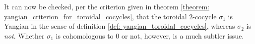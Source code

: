 \begin{example}
            It can now be checked, per the criterion given in theorem \ref{theorem: yangian_criterion_for_toroidal_cocycles}, that the toroidal $2$-cocycle $\sigma_1$ is Yangian in the sense of definition \ref{def: yangian_toroidal_cocycles}, whereas $\sigma_2$ is \textit{not}. Whether $\sigma_1$ is cohomologous to $0$ or not, however, is a much subtler issue.
            
        \end{example}